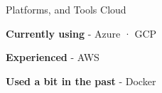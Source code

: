 \begin{cventries}
{\begin{cvitems}
      \end{cvitems}
    }
  \cventry
    {Platforms, and Tools} %
    {Cloud} %
    {} %
    {} %
    {
      \begin{cvitems} %
        \item {\textbf{Currently using} \hspace{0.03cm} - \hspace{0.03cm} Azure \hspace{0.03cm} · \hspace{0.03cm} GCP} %
        \item {\textbf{Experienced} \hspace{0.03cm} - \hspace{0.03cm} AWS } %
        \item {\textbf{Used a bit in the past} \hspace{0.03cm} - \hspace{0.03cm} Docker \\} %
      \end{cvitems}
    }


\end{cventries}
